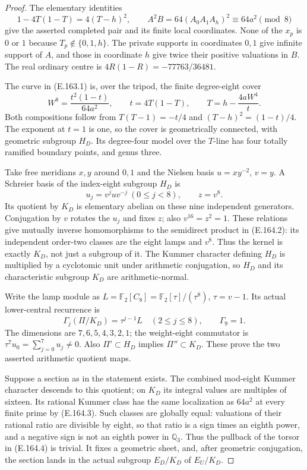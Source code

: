 \begin{proof}
The elementary identities
\[
 1-4T(1-T)=4(T-h)^2,\qquad
 A^2B=64(A_0A_1A_h)^2\equiv64a^2\pmod{8}
\tag{E.164.3}
\]
give the asserted completed pair and its finite local
coordinates.  None of the $x_p$ is $0$ or $1$ because
$T_p\notin\{0,1,h\}$.  The private supports in coordinates
$0,1$ give infinite support of $A$, and those in coordinate
$h$ give twice their positive valuations in $B$.  The real
ordinary centre is $4R(1-R)=-77763/36481$.

The curve in (E.163.1) is, over the tripod, the finite
degree-eight cover
\[
 W^8=\frac{t^2(1-t)}{64a^2},\qquad
 t=4T(1-T),\qquad T=h-\frac{4aW^4}{t}.
\tag{E.164.4}
\]
Both compositions follow from $T(T-1)=-t/4$ and
$(T-h)^2=(1-t)/4$.  The exponent at $t=1$ is one, so the
cover is geometrically connected, with geometric subgroup
$H_D$.  Its degree-four model over the $T$-line has four
totally ramified boundary points, and genus three.

Take free meridians $x,y$ around $0,1$ and the Nielsen basis
$u=xy^{-2}$, $v=y$.  A Schreier basis of the index-eight
subgroup $H_D$ is
\[
 u_j=v^juv^{-j}\ (0\le j<8),\qquad z=v^8.
\]
Its quotient by $K_D$ is elementary abelian on these nine
independent generators.  Conjugation by $v$ rotates the
$u_j$ and fixes $z$; also $v^{16}=z^2=1$.
These relations give mutually inverse homomorphisms to
the semidirect product in (E.164.2): its independent
order-two classes are the eight lamps and $v^8$.
Thus the kernel is exactly $K_D$, not just a subgroup of it.
The Kummer character defining $H_D$ is multiplied by a
cyclotomic unit under arithmetic conjugation, so $H_D$
and its characteristic subgroup $K_D$ are arithmetic-normal.

Write the lamp module as
$L=\mathbb F_2[C_8]=\mathbb F_2[\tau]/(\tau^8)$,
$\tau=v-1$.  Its actual lower-central recurrence is
\[
 \Gamma_j(\Pi/K_D)=\tau^{j-1}L\quad(2\le j\le8),
 \qquad\Gamma_9=1.
\tag{E.164.5}
\]
The dimensions are $7,6,5,4,3,2,1$; the weight-eight
commutator is $\tau^7u_0=\sum_{j=0}^7u_j\ne0$.
Also $\Pi'\subset H_D$ implies $\Pi''\subset K_D$.
These prove the two asserted arithmetic quotient maps.

Suppose a section as in the statement exists.  The combined
mod-eight Kummer character descends to this quotient;
on $K_D$ its integral values are multiples of sixteen.
Its rational Kummer class has the same localization as
$64a^2$ at every finite prime by (E.164.3).  Such classes
are globally equal: valuations of their rational ratio
are divisible by eight, so that ratio is a sign times an
eighth power, and a negative sign is not an eighth power
in $\mathbb Q_3$.  Thus the pullback of the torsor in
(E.164.4) is trivial.  It fixes a geometric sheet, and,
after geometric conjugation, the section lands in the
actual subgroup $E_D/K_D$ of $E_U/K_D$.


\end{proof}
